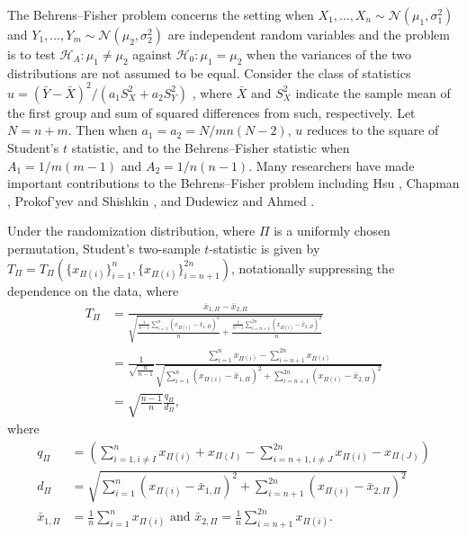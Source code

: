 The Behrens--Fisher \cite{behrens1928beitrag, fisher1935fiducial} problem concerns the setting
when $X_1, \ldots, X_n \sim \mathcal{N}(\mu_1, \sigma_1^2)$ and
$Y_1, \ldots, Y_m \sim \mathcal{N}(\mu_2, \sigma_2^2)$ are
independent random variables and the problem is to test $\mathcal{H}_A: \mu_1 \neq \mu_2$
against $\mathcal{H}_0: \mu_1 = \mu_2$ when the variances of the two
distributions are not assumed to be equal.  Consider the class
of statistics $u = (\bar{Y} - \bar{X})^2 / (a_1 S_{X}^2 + a_2 S_{Y}^2)$
, where $\bar{X}$ and $S_{X}^2$ indicate the sample mean of the
first group and sum of squared differences from such, respectively.
Let $N = n + m$.  Then when $a_1 = a_2 = N / mn(N-2) $, $u$ reduces to the
square of Student's $t$ statistic, and to the Behrens--Fisher
statistic when $A_1 = 1 / m(m-1)$ and $A_2 = 1 / n(n-1)$.  Many
researchers have made important contributions to the Behrens--Fisher
problem including Hsu \cite{hsu1938contribution}, Chapman
\cite{MR0043423}, Prokof'yev and Shishkin \cite{prokof1974successive},
and Dudewicz and Ahmed \cite{dudewicz1998new, dudewicz1999new}.

Under the randomization distribution, where
$\Pi$ is a uniformly chosen permutation, Student's two-sample
$t$-statistic is given by $T_{\Pi} = T_{\Pi}(\{x_{\Pi(i)}\}_{i=1}^n,
\{x_{\Pi(i)}\}_{i=n+1}^{2n})$, notationally suppressing the
dependence on the data, where
\begin{align*}
T_{\Pi}
&= \frac{\bar{x}_{1,\Pi} - \bar{x}_{2,\Pi}}{\sqrt{\frac{\frac{1}{n-1}
      \sum_{i=1}^n(x_{\Pi(i)} - \bar{x}_{1,\Pi})^2}{n} + \frac{\frac{1}{n-1}
      \sum_{i=n+1}^{2n}(x_{\Pi(i)} - \bar{x}_{2,\Pi})^2}{n}}} \\
&= \frac{1}{\sqrt{\frac{n}{n-1}}} \frac{\sum_{i=1}^n x_{\Pi(i)} -
  \sum_{i=n+1}^{2n}x_{\Pi(i)}}{\sqrt{\sum_{i=1}^n(x_{\Pi(i)} -
    \bar{x}_{1,\Pi})^2 + \sum_{i=n+1}^{2n}(x_{\Pi(i)} - \bar{x}_{2,\Pi})^2}} \\
&= \sqrt{\frac{n-1}{n}}\frac{q_\Pi}{d_\Pi},
\end{align*}
where
\begin{align*}
  q_\Pi &= \left (\sum_{i=1, i\neq I}^n x_{\Pi(i)} + x_{\Pi(I)} -
    \sum_{i=n+1, i\neq J}^{2n}x_{\Pi(i)} - x_{\Pi(J)}\right ) \\
  d_\Pi &= \sqrt{\sum_{i=1}^n(x_{\Pi(i)} - \bar{x}_{1,\Pi})^2 +
    \sum_{i=n+1}^{2n}(x_{\Pi(i)} - \bar{x}_{2,\Pi})^2} \\
  \bar{x}_{1,\Pi} &= \frac{1}{n} \sum_{i=1}^n x_{\Pi(i)} \text{ and }
  \bar{x}_{2,\Pi} = \frac{1}{n} \sum_{i=n+1}^{2n} x_{\Pi(i)}.
\end{align*}

